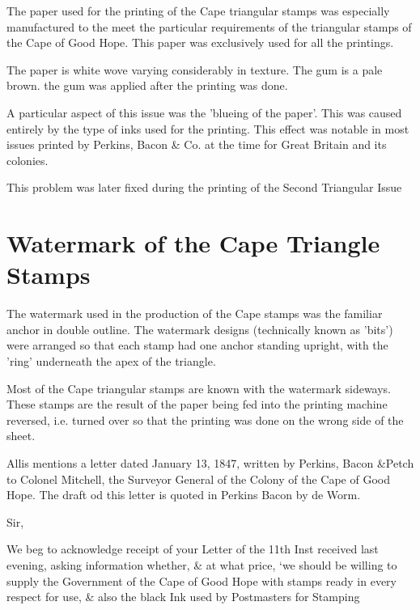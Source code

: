 The paper used for the printing of the Cape triangular stamps was especially manufactured to the meet the particular requirements of the triangular stamps of the Cape of Good Hope. This paper was exclusively used for all the printings.

The paper is white wove varying considerably in texture. The gum is a pale brown. the gum was applied after the printing was done.

A particular aspect of this issue was the 'blueing of the paper'. This was caused entirely by the type of inks used for the printing. This effect was notable in most issues printed by Perkins, Bacon \& Co. at the time for Great Britain and its colonies.

This problem was later fixed during the printing of the Second Triangular Issue

\section{Watermark of the Cape Triangle Stamps}

The watermark used in the production of the Cape stamps was the familiar anchor in double outline. The watermark designs (technically known as 'bits') were arranged so that each stamp had one anchor standing upright, with the 'ring' underneath the apex of the triangle.

Most of the Cape triangular stamps are known with the watermark sideways. These stamps are the result of the paper being fed into the printing machine reversed, i.e. turned over so that the printing was done on the wrong side of the sheet.


Allis mentions a letter dated January 13, 1847, written by Perkins, Bacon \&Petch to Colonel Mitchell, the Surveyor General of the Colony of the Cape of Good Hope. The draft od this letter is quoted in Perkins Bacon by de Worm.

Sir,

We beg to acknowledge receipt of your Letter of the 11th Inst received last evening, asking information whether, \& at what price, `we should be willing to supply the Government of the Cape of Good Hope with stamps ready in every respect for use, \& also the black Ink used by Postmasters for Stamping 

